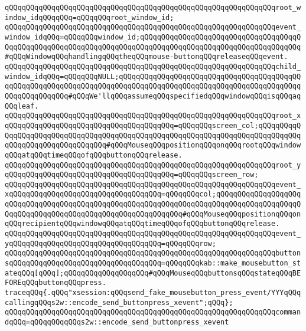 \verb|qQQqqQQqqQQqqQQqqQQqqQQqqQQqqQQqqQQqqQQqqQQqqQQqqQQqqQQqqQQqqQQqroot_window_idqQQqqQQq=qQQqqQQqroot_window_id;|\newline
\verb|qQQqqQQqqQQqqQQqqQQqqQQqqQQqqQQqqQQqqQQqqQQqqQQqqQQqqQQqqQQqqQQqevent_window_idqQQq=qQQqqQQqwindow_id;qQQqqQQqqQQqqQQqqQQqqQQqqQQqqQQqqQQqqQQqqQQqqQQqqQQqqQQqqQQqqQQqqQQqqQQqqQQqqQQqqQQqqQQqqQQqqQQqqQQqqQQqqQQq#qQQqWindowqQQqhandlingqQQqtheqQQqmouse-buttonqQQqreleaseqQQqevent.|\newline
\verb|qQQqqQQqqQQqqQQqqQQqqQQqqQQqqQQqqQQqqQQqqQQqqQQqqQQqqQQqqQQqqQQqchild_window_idqQQq=qQQqqQQqNULL;qQQqqQQqqQQqqQQqqQQqqQQqqQQqqQQqqQQqqQQqqQQqqQQqqQQqqQQqqQQqqQQqqQQqqQQqqQQqqQQqqQQqqQQqqQQqqQQqqQQqqQQqqQQqqQQqqQQqqQQqqQQqqQQq#qQQqWe'llqQQqassumeqQQqspecifiedqQQqwindowqQQqisqQQqaqQQqleaf.|\newline
\verb|qQQqqQQqqQQqqQQqqQQqqQQqqQQqqQQqqQQqqQQqqQQqqQQqqQQqqQQqqQQqqQQqroot_xqQQqqQQqqQQqqQQqqQQqqQQqqQQqqQQqqQQqqQQq=qQQqqQQqscreen_col;qQQqqQQqqQQqqQQqqQQqqQQqqQQqqQQqqQQqqQQqqQQqqQQqqQQqqQQqqQQqqQQqqQQqqQQqqQQqqQQqqQQqqQQqqQQqqQQqqQQqqQQq#qQQqMouseqQQqpositionqQQqonqQQqrootqQQqwindowqQQqatqQQqtimeqQQqofqQQqbuttonqQQqrelease.|\newline
\verb|qQQqqQQqqQQqqQQqqQQqqQQqqQQqqQQqqQQqqQQqqQQqqQQqqQQqqQQqqQQqqQQqroot_yqQQqqQQqqQQqqQQqqQQqqQQqqQQqqQQqqQQqqQQq=qQQqqQQqscreen_row;|\newline
\verb|qQQqqQQqqQQqqQQqqQQqqQQqqQQqqQQqqQQqqQQqqQQqqQQqqQQqqQQqqQQqqQQqevent_xqQQqqQQqqQQqqQQqqQQqqQQqqQQqqQQqqQQq=qQQqqQQqcol;qQQqqQQqqQQqqQQqqQQqqQQqqQQqqQQqqQQqqQQqqQQqqQQqqQQqqQQqqQQqqQQqqQQqqQQqqQQqqQQqqQQqqQQqqQQqqQQqqQQqqQQqqQQqqQQqqQQqqQQqqQQqqQQqqQQq#qQQqMouseqQQqpositionqQQqonqQQqrecipientqQQqwindowqQQqatqQQqtimeqQQqofqQQqbuttonqQQqrelease.|\newline
\verb|qQQqqQQqqQQqqQQqqQQqqQQqqQQqqQQqqQQqqQQqqQQqqQQqqQQqqQQqqQQqqQQqevent_yqQQqqQQqqQQqqQQqqQQqqQQqqQQqqQQqqQQq=qQQqqQQqrow;|\newline
\verb|qQQqqQQqqQQqqQQqqQQqqQQqqQQqqQQqqQQqqQQqqQQqqQQqqQQqqQQqqQQqqQQqbuttonsqQQqqQQqqQQqqQQqqQQqqQQqqQQqqQQqqQQq=qQQqqQQqkab::make_mousebutton_stateqQQq[qQQq];qQQqqQQqqQQqqQQqqQQq#qQQqMouseqQQqbuttonsqQQqstateqQQqBEFOREqQQqbuttonqQQqpress.|\newline
\newline
\verb|traceqQQq{.qQQq"xsession:qQQqsend_fake_mousebutton_press_event/YYYqQQqcallingqQQqs2w::encode_send_buttonpress_xevent";qQQq};|\newline
\verb|qQQqqQQqqQQqqQQqqQQqqQQqqQQqqQQqqQQqqQQqqQQqqQQqqQQqqQQqqQQqqQQqcommandqQQq=qQQqqQQqqQQqs2w::encode_send_buttonpress_xevent|\newline
